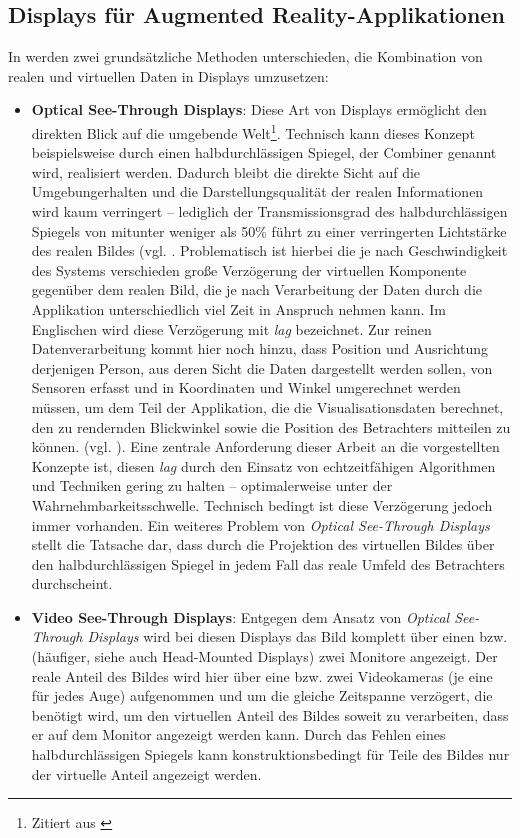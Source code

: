 \documentclass[ngerman,pdftex,paper=A4,DIV=calc,titlepage,12pt]{scrartcl}
\newtheorem[L]{boxedDefinition}{Definition}
\newcommand{\footnoteremember}[2]{\footnote{#2}\newcounter{#1}\setcounter{#1}{\value{footnote}}}
\newcommand{\footnoterecall}[1]{\footnotemark[\value{#1}]}
\begin{document}
\subsection{Displays für Augmented Reality-Applikationen}\label{ssec:ardisplays}
In \cite[Kapitel 2.2, Seite 21]{Toe2010} werden zwei grundsätzliche Methoden unterschieden, die Kombination von realen und virtuellen Daten in Displays umzusetzen:
\begin{itemize}
 \item \textbf{Optical See-Through Displays}: Diese Art von Displays ermöglicht den \glqq direkten Blick auf die umgebende Welt\grqq\footnoteremember{f:Toe2010-S21}{Zitiert aus \cite[Kapitel 2.2, Seite 21f.]{Toe2010}}. Technisch kann dieses Konzept beispielsweise durch einen halbdurchlässigen Spiegel, der Combiner genannt wird, realisiert werden. Dadurch bleibt die \glqq direkte Sicht auf die Umgebung\grqq\footnoterecall{f:Toe2010-S21} erhalten und die Darstellungsqualität der realen Informationen wird kaum verringert -- lediglich der Transmissionsgrad des halbdurchlässigen Spiegels von mitunter weniger als 50\% führt zu einer verringerten Lichtstärke des realen Bildes (vgl. \cite[Kapitel 3.1.3, Seite 7]{Suthau2002DE}. Problematisch ist hierbei die je nach Geschwindigkeit des Systems verschieden große Verzögerung der virtuellen Komponente gegenüber dem realen Bild, die je nach Verarbeitung der Daten durch die Applikation unterschiedlich viel Zeit in Anspruch nehmen kann. Im Englischen wird diese Verzögerung mit \textit{lag} bezeichnet. Zur reinen Datenverarbeitung kommt hier noch hinzu, dass Position und Ausrichtung derjenigen Person, aus deren Sicht die Daten dargestellt werden sollen, von Sensoren erfasst und in Koordinaten und Winkel umgerechnet werden müssen, um dem Teil der Applikation, die die Visualisationsdaten berechnet, den zu rendernden Blickwinkel sowie die Position des Betrachters mitteilen zu können. (vgl. \cite[Kapitel 2.2, Seite 21f.]{Toe2010}). Eine zentrale Anforderung dieser Arbeit an die vorgestellten Konzepte ist, diesen \textit{lag} durch den Einsatz von echtzeitfähigen Algorithmen und Techniken gering zu halten -- optimalerweise unter der Wahrnehmbarkeitsschwelle. Technisch bedingt ist diese Verzögerung jedoch immer vorhanden. Ein weiteres Problem von \textit{Optical See-Through Displays} stellt die Tatsache dar, dass durch die Projektion des virtuellen Bildes über den halbdurchlässigen Spiegel in jedem Fall das reale Umfeld des Betrachters durchscheint.
 \item \textbf{Video See-Through Displays}: Entgegen dem Ansatz von \textit{Optical See-Through Displays} wird bei diesen Displays das Bild komplett über einen bzw. (häufiger, siehe auch \glqq Head-Mounted Displays\grqq) zwei Monitore angezeigt. Der reale Anteil des Bildes wird hier über eine bzw. zwei Videokameras (je eine für jedes Auge) aufgenommen und um die gleiche Zeitspanne verzögert, die benötigt wird, um den virtuellen Anteil des Bildes soweit zu verarbeiten, dass er auf dem Monitor angezeigt werden kann. Durch das Fehlen eines halbdurchlässigen Spiegels kann konstruktionsbedingt für Teile des Bildes nur der virtuelle Anteil angezeigt werden.

\end{itemize}
\end{document}
